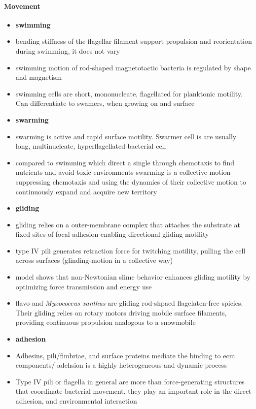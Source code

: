 \documentclass{article}
\begin{document}
\paragraph{Movement}
\begin{itemize}
    \item \textbf{swimming}
    \item \cite{Shen2022} bending stiffness of the flagellar filament support propulsion and reorientation during swimming, it does not vary
    \item \cite{Kong2014} swimming motion of rod-shaped magnetotactic bacteria is regulated by shape and magnetism
    \item \cite{Alberti1990} swimming cells are short, mononucleate, flagellated for planktonic motility. Can differentiate to swamers, when growing on and surface
    \item \textbf{swarming}
    \item \cite{Harshey1994} swarming is active and rapid surface motility. Swarmer cell is are usually long, multinucleate, hyperflagellated bacterial cell
    \item \cite{Harshey2015} compared to swimming which direct a single through chemotaxis to find nutrients and avoid toxic environments swarming is a collective motion suppressing chemotaxis and using the dynamics of their collective motion to continuously expand and acquire new territory
    \item \textbf{gliding}
    \item \cite{ContrerasM2024} gliding relies on a outer-membrane complex that attaches the substrate at fixed sites of focal adhesion enabling directional gliding motility
    \item \cite{Chang2016 }type IV pili generates retraction force for twitching motility, pulling the cell across surfaces (glinding-motion in a collective way)
    \item \cite{Shah2022} model shows that non-Newtonian slime behavior enhances gliding motility by optimizing force transmission and energy use
    \item \cite{Shrivastava2015} \ac{flavo} and \textit{Myxococcus xanthus} are gliding rod-shpaed flagelaten-free spicies. Their gliding relies on rotary motors driving mobile surface filaments, providing continuous propulsion analogous to a snowmobile
    \item \textbf{adhesion}
    \item \cite{BrettFinlay2014, Berne2018} Adhesins, pili/fimbriae, and surface proteins mediate the binding to \ac{ecm} components/ adehsion is a highly heterogeneous and dynamic process
    \item Type IV pili \cite{Ellison2021} or flagella in general \cite{Haiko2013} are more than force-generating structures that coordinate bacterial movement, they play an important role in the direct adhesion, and environmental interaction
\end{itemize}
\end{document}
